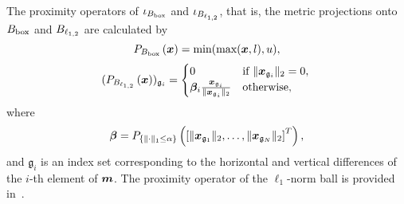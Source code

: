 The proximity operators of $\iota_{B_{\mathrm{box}}}$ and $\iota_{B_{\ell_{1,2}}}$, that is, the metric projections onto $B_{\mathrm{box}}$ and ${B_{\ell_{1,2}}}$ are calculated by
\begin{equation} \label{eq:ProximityOperatorForBoxConstraint} \projBoxSolution, \end{equation}
\begin{equation} \label{eq:ProximityOperatorForL12Ball} \projLOneTwoBallSolution \end{equation}
where
\begin{equation} \label{eq:ProximityOperatorForL12BallWhere} \projLOneTwoBallSolutionWhere, \end{equation}
and $\mathfrak{g}_i$ is an index set corresponding to the horizontal and vertical differences of the $i$-th element of $\bm{m}$.
The proximity operator of the $\ell_1$-norm ball is provided in~\cite{L1-ball-projection}.


